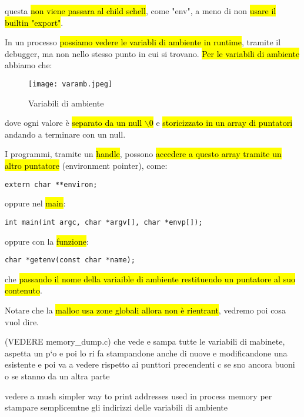 questa \hl{non viene passara al child schell}, come "env", a meno di non \hl{usare il builtin "export"}.

In un processo \hl{possiamo vedere le variabli di ambiente in runtime}, tramite il debugger, ma non nello stesso punto in cui si trovano. \hl{Per le variabili di ambiente} abbiamo che:


\begin{figure}[H]
\centering
\texttt{[image: varamb.jpeg]}
\caption{Variabili di ambiente} 
\label{varamb}
\end{figure}


dove ogni valore è \hl{separato da un null $\backslash 0$} e \hl{storicizzato in un array di puntatori} andando a terminare con un null.

I programmi, tramite un \hl{handle}, possono \hl{accedere a questo array tramite un altro puntatore} (environment pointer), come:

\begin{lstlisting}
extern char **environ;
\end{lstlisting}

oppure nel \hl{main}:
\begin{lstlisting}
int main(int argc, char *argv[], char *envp[]);
\end{lstlisting}

oppure con la \hl{funzione}:
\begin{lstlisting}
char *getenv(const char *name);
\end{lstlisting}

che \hl{passando il nome della variaible di ambiente restituendo un puntatore al suo contenuto}.

Notare che la \hl{malloc usa zone globali allora non è rientrant}, vedremo poi cosa vuol dire.






(VEDERE memory\_dump.c) che vede e sampa tutte le variabili di mabinete, aspetta un p`o e poi lo ri fa stampandone anche di nuove e modificandone una esistente e poi va a vedere rispetto ai punttori precendenti c se sno ancora buoni  o se stanno da un altra parte 

vedere a mush simpler way to print addresses used in process memory per stampare semplicemtne gli indirizzi delle variabili di ambiente